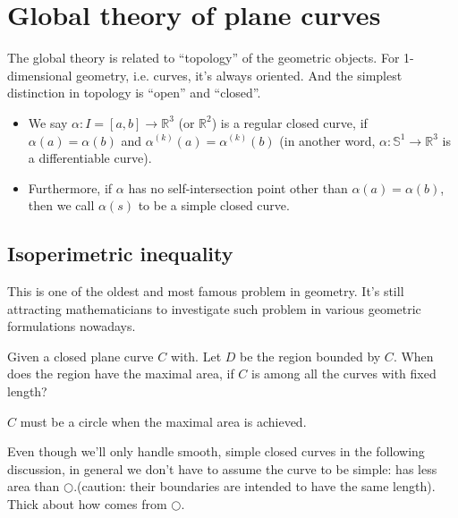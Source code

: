 \section{Global theory of plane curves}

The global theory is related to ``topology'' of the geometric objects.
For 1-dimensional geometry, i.e. curves, it's always oriented. And the simplest distinction in topology 
is ``open'' and ``closed''. 

\begin{definition}
    \begin{itemize}\hfill
        \item We say 
        \(\alpha\colon I=[a,b]\to \mathbb{R}
        ^3\) 
        (or \(\mathbb{R}^2\)) 
        is a regular closed 
        curve, if 
        \(\alpha(a)=\alpha(b)\) 
        and 
        \(\alpha^{(k)}
        (a)=\alpha^{(k)}(b)\)
        (in another word, 
        \(\alpha\colon \mathbb{S}^1\to \mathbb{R}^3\) 
        is a differentiable curve).
        \item Furthermore, if 
        \(\alpha\) 
        has no 
        self-intersection point other than 
        $\alpha(a)=\alpha(b)$, 
        then we call $\alpha(s)$ to be a simple closed curve.
    \end{itemize}
\end{definition}
\begin{center}
\end{center}

\subsection{Isoperimetric inequality}
This is one of the oldest and most famous problem in geometry. It's still attracting mathematicians to investigate such problem in various geometric formulations nowadays.
\begin{question}
    Given a closed plane curve \(C\) with. Let \(D\) be the
     region bounded by \(C\). When does the region have the 
     maximal area, if \(C\) is among all the curves with 
     fixed length?
\end{question}
\begin{answer}
    \(C\) must be a circle when the maximal area is 
    achieved.
\end{answer}
\begin{remark}
    Even though we'll only handle smooth, simple closed 
    curves in the following discussion, in general we 
    don't have to assume the curve to be simple: 
    {\ooalign{$\bigcirc $\cr $\ \ \,\bigcirc $}}
    has less area than $\bigcirc $.(caution: their boundaries are intended to have the same length). Thick about how 
    {\ooalign{$\bigcirc $\cr $\ \ \,\bigcirc $}}
    comes from $\bigcirc $.
\end{remark}

